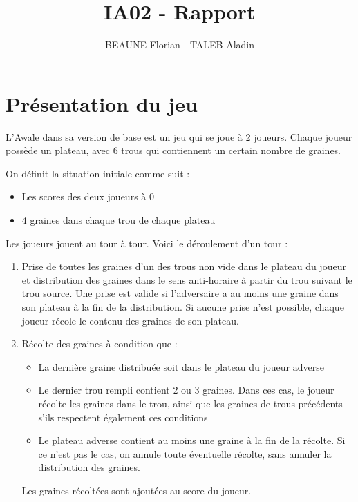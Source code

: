 \documentclass[]{article}
\title{IA02 - Rapport}
\author{BEAUNE Florian - TALEB Aladin}
\date{}
\begin{document}
\maketitle

\begin{abstract}

\end{abstract}

\section{Présentation du jeu}

L'Awale dans sa version de base est un jeu qui se joue à 2 joueurs. Chaque joueur possède un plateau, avec 6 trous qui contiennent un certain nombre de graines.

On définit la situation initiale comme suit : 
\begin{itemize}
\item Les scores des deux joueurs à 0
\item 4 graines dans chaque trou de chaque plateau
\end{itemize}

Les joueurs jouent au tour à tour. Voici le déroulement d'un tour : 

\begin{enumerate}
\item Prise de toutes les graines d'un des trous non vide dans le plateau du joueur et distribution des graines dans le sens anti-horaire à partir du trou suivant le trou source.
\subitem Une prise est valide si l'adversaire a au moins une graine dans son plateau à la fin de la distribution. Si aucune prise n'est possible, chaque joueur récole le contenu des graines de son plateau.
\item Récolte des graines à condition que :
	\begin{itemize}
	\item La dernière graine distribuée soit dans le plateau du joueur adverse
	\item Le dernier trou rempli contient 2 ou 3 graines. 
	\subitem Dans ces cas, le joueur récolte les graines dans le trou, ainsi que les graines de trous précédents s'ils respectent également ces conditions
	\item Le plateau adverse contient au moins une graine à la fin de la récolte. Si ce n'est pas le cas, on annule toute éventuelle récolte, sans annuler la distribution des graines.
	\end{itemize}
	\subitem Les graines récoltées sont ajoutées au score du joueur.
\end{enumerate}
\end{document}
